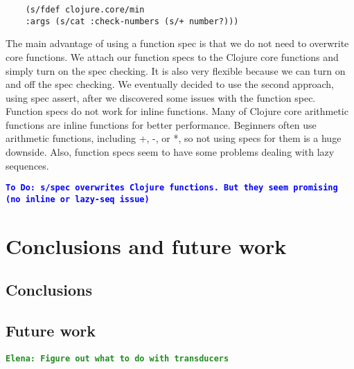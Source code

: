 \documentclass[12pt]{article}
\newcommand{\comment}[1]{{\bf \tt  {#1}}}
\newcommand{\emcomment}[1]{\textcolor{ForestGreen}{\comment{Elena: {#1}}}}
\newcommand{\todo}[1]{\textcolor{blue}{\comment{To Do: {#1}}}}
\begin{document}
	\begin{verbatim}
	(s/fdef clojure.core/min
	:args (s/cat :check-numbers (s/+ number?)))
	\end{verbatim}

	The main advantage of using a function spec is that we do not need to overwrite core functions. We attach our 
	function specs to the Clojure core functions and simply turn on the spec checking. It is also very flexible because we 
	can turn on and off the spec checking. We eventually decided to use the second approach, using spec assert, after we 
	discovered some issues with the function spec. Function specs do not work for inline functions. Many of Clojure core 
	arithmetic functions are inline functions for better performance. Beginners often use arithmetic functions, including +, -, 
	or *, so not using specs for them is a huge downside. Also, function specs seem to have some problems dealing with 
	lazy sequences. 

	\todo{s/spec overwrites Clojure functions. But they seem promising (no inline or lazy-seq issue)}

\section{Conclusions and future work}
	\subsection{Conclusions}
	\subsection{Future work}
\emcomment{Figure out what to do with transducers}
	


\end{document}
